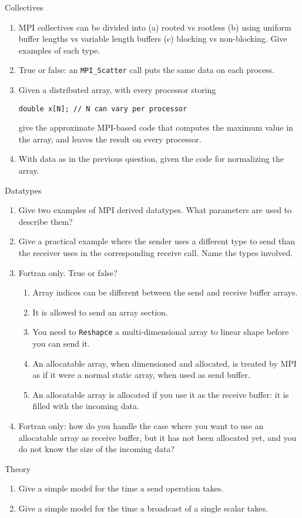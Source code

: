  {Collectives}

\begin{enumerate}

\item MPI collectives can be divided into (a) rooted vs rootless (b) using uniform
buffer lengths vs variable length buffers (c) blocking vs non-blocking. Give examples of
each type.  

\item True or false: an \lstinline{MPI_Scatter} call puts the same data on
  each process.

\item Given a distributed array, with every processor storing
\begin{lstlisting}
double x[N]; // N can vary per processor
\end{lstlisting}
give the approximate MPI-based code that computes the maximum value
in the array, and leaves the result on every processor.

\item With data as in the previous question, given the code for
normalizing the array.
\end{enumerate}

 {Datatypes}

\begin{enumerate}
\item Give two examples of MPI derived datatypes. What parameters are used
to describe them?

\item Give a practical example where the sender uses a different type to send
  than the receiver uses in the corresponding receive call. Name the types involved.

\item Fortran only. True or false?
  \begin{enumerate}
  \item Array indices can be different between the send and receive buffer arrays.
  \item It is allowed to send an array section.
  \item You need to \lstinline{Reshapce} a multi-dimensional array
    to linear shape before you can send it.
  \item An allocatable array, when dimensioned and allocated, is
    treated by MPI as if it were a normal static array, when used as
    send buffer.
  \item An allocatable array is allocated if you use it as the receive
    buffer: it is filled with the incoming data.
  \end{enumerate}
\item Fortran only: how do you handle the case where you want to use
  an allocatable array as receive buffer, but it has not been
  allocated yet, and you do not know the size of the incoming data?

\end{enumerate}

 {Theory}

\begin{enumerate}

\item Give a simple model for the time a send operation takes.

\item Give a simple model for the time a broadcast of a single scalar takes.


\end{enumerate}

